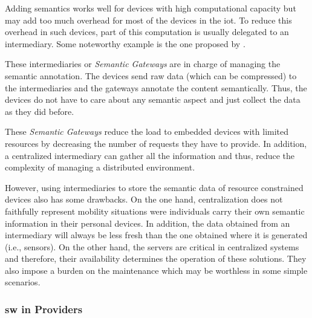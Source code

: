 Adding semantics works well for devices with high computational capacity but may add too much overhead for most of the devices in the \ac{iot}.
To reduce this overhead in such devices, part of this computation is usually delegated to an intermediary.
Some noteworthy example is the one proposed by \citet{broring_semantic_2009}.




These intermediaries or \emph{Semantic Gateways} are in charge of managing the semantic annotation.
The devices send raw data (which can be compressed) to the intermediaries and the gateways annotate the content semantically.
Thus, the devices do not have to care about any semantic aspect and just collect the data as they did before.

These \emph{Semantic Gateways} reduce the load to embedded devices with limited resources by decreasing the number of requests they have to provide.
In addition, a centralized intermediary can gather all the information and thus, reduce the complexity of managing a distributed environment.

However, using intermediaries to store the semantic data of resource constrained devices also has some drawbacks.
On the one hand, centralization does not faithfully represent mobility situations were individuals carry their own semantic information in their personal devices.
In addition, the data obtained from an intermediary will always be less fresh than the one obtained where it is generated (i.e., sensors).
On the other hand, the servers are critical in centralized systems and therefore, their availability determines the operation of these solutions.
They also impose a burden on the maintenance which may be worthless in some simple scenarios.






\subsubsection{\acs{sw} in Providers}
\label{sec:sw_providers}

